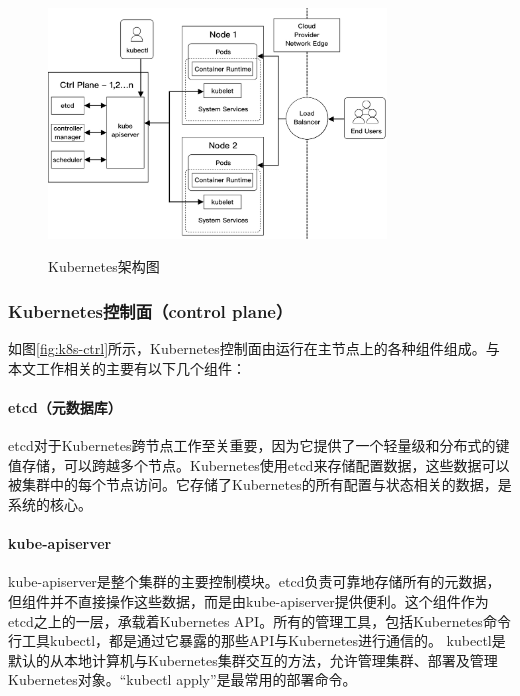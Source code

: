 \documentclass[macfonts,master]{njuthesis}
\begin{document}
\begin{figure}[htbp]
  \centering
  \includegraphics[width=0.8\textwidth]{pics/Kubernetes-architecture.pdf}\\
  \caption{Kubernetes架构图}\label{fig:k8s-arch}
\end{figure}

\subsubsection{Kubernetes控制面（control plane）}
如图\ref{fig:k8s-ctrl}所示，Kubernetes控制面由运行在主节点上的各种组件组成。与本文工作相关的主要有以下几个组件：

\paragraph{etcd（元数据库）}

etcd对于Kubernetes跨节点工作至关重要，因为它提供了一个轻量级和分布式的键值存储，可以跨越多个节点。Kubernetes使用etcd来存储配置数据，这些数据可以被集群中的每个节点访问。它存储了Kubernetes的所有配置与状态相关的数据，是系统的核心。

\paragraph{kube-apiserver}
kube-apiserver是整个集群的主要控制模块。etcd负责可靠地存储所有的元数据，但组件并不直接操作这些数据，而是由kube-apiserver提供便利。这个组件作为etcd之上的一层，承载着Kubernetes API。所有的管理工具，包括Kubernetes命令行工具kubectl，都是通过它暴露的那些API与Kubernetes进行通信的。 kubectl是默认的从本地计算机与Kubernetes集群交互的方法，允许管理集群、部署及管理Kubernetes对象。``kubectl apply''是最常用的部署命令。
\end{document}
